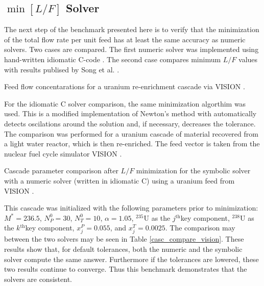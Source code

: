 \documentclass[preprint,12pt]{elsarticle}
\newcommand{\superscript}[1]{\ensuremath{^{\textrm{#1}}}}
\newcommand{\nuc}[2]{\superscript{#2}{#1}}
\newcommand{\jth}[0]{$j$\superscript{th}}
\newcommand{\kth}[0]{$k$\superscript{th}}
\begin{document}
\subsection{$\min\left[L/F\right]$ Solver}
\label{sec:minl-solver}

The next step of the benchmark presented here is to verify that the minimization
of the total flow rate per unit feed has at least the same accuracy as 
numeric solvers.  Two cases are compared.  The first numeric solver was implemented 
using hand-written idiomatic C-code \cite{pyne:enrichment}.  The second case compares
minimum $L/F$ values with results publised by Song et al. 
\cite{doi:10.1080/01496391003793884}.

\begin{table}[htbp]
\begin{center}
\caption{Feed flow concentarations for a uranium re-enrichment cascade via  
    VISION \cite{Jacobson2009}.}

\end{center}
\label{feed_vision}
\end{table}

For the idiomatic C solver comparison, the same minimization algorthim was used.  
This is a modified implementation of Newton's method with automatically detects 
oscilations around the solution and, if necessary, decreases the tolerance.
The comparison was performed for a uranium cascade of material recovered from 
a light water reactor, which is then re-enriched.  The feed vector is taken from the
nuclear fuel cycle simulator VISION \cite{Jacobson2009}.

\begin{table}[htbp]
\begin{center}
\caption{Cascade parameter comparison after $L/F$ minimization for the symbolic 
    solver with a numeric solver (written in idiomatic C) using a uranium feed from 
    VISION \cite{Jacobson2009}.}

\end{center}
\label{casc_compare_vision}
\end{table}

This cascade was initialized with the following parameters prior to minimization: 
$M^*=236.5$, $N_P^0=30$, $N_T^0=10$, $\alpha=1.05$, \nuc{U}{235} as the \jth key 
component, \nuc{U}{238} as the \kth key component, $x_j^P=0.055$, and 
$x_j^T=0.0025$.  The comparison may between the two solvers may be seen in Table
\ref{casc_compare_vision}.  These results show that, for default tolerances, 
both the numeric and the symbolic solver compute the same answer.  Furthermore
if the tolerances are lowered, these two results continue to converge.  Thus this 
benchmark demonstrates that the solvers are consistent.
\end{document}
